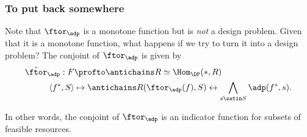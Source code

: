 \subsubsection{To put back somewhere}
Note that $\ftor_\adp$ is a monotone function but is \emph{not} a design problem.
Given that it is a monotone function, what happens if we try to turn it into a design problem?
The conjoint of $\ftor_\adp$ is given by
\begin{equation}
    \begin{aligned}
        \hat \ftor_\adp : F    & \profto \antichains R \simeq \Hom_\DP(\ast, R) \\
        \langle f^*, S \rangle & \mapsto \antichains R(\ftor_\adp(f), S) \leftrightarrow \bigwedge_{s\setin S} \adp(f^*, s).
    \end{aligned}
\end{equation}

In other words, the conjoint of $\ftor_\adp$ is an indicator function for subsets of feasible resources.

